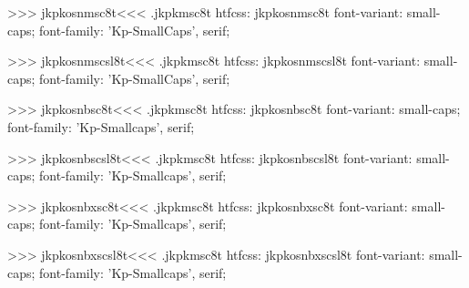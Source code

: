 >>>
\<jkpkosnmsc8t\><<<
.jkpkmsc8t
htfcss:  jkpkosnmsc8t  font-variant: small-caps; font-family: 'Kp-SmallCaps', serif;

>>>
\<jkpkosnmscsl8t\><<<
.jkpkmsc8t
htfcss:  jkpkosnmscsl8t  font-variant: small-caps; font-family: 'Kp-SmallCaps', serif;

>>>
\<jkpkosnbsc8t\><<<
.jkpkmsc8t
htfcss:  jkpkosnbsc8t  font-variant: small-caps; font-family: 'Kp-Smallcaps', serif;

>>>
\<jkpkosnbscsl8t\><<<
.jkpkmsc8t
htfcss:  jkpkosnbscsl8t  font-variant: small-caps; font-family: 'Kp-Smallcaps', serif;

>>>
\<jkpkosnbxsc8t\><<<
.jkpkmsc8t
htfcss:  jkpkosnbxsc8t  font-variant: small-caps; font-family: 'Kp-Smallcaps', serif;

>>>
\<jkpkosnbxscsl8t\><<<
.jkpkmsc8t
htfcss:  jkpkosnbxscsl8t  font-variant: small-caps; font-family: 'Kp-Smallcaps', serif;

